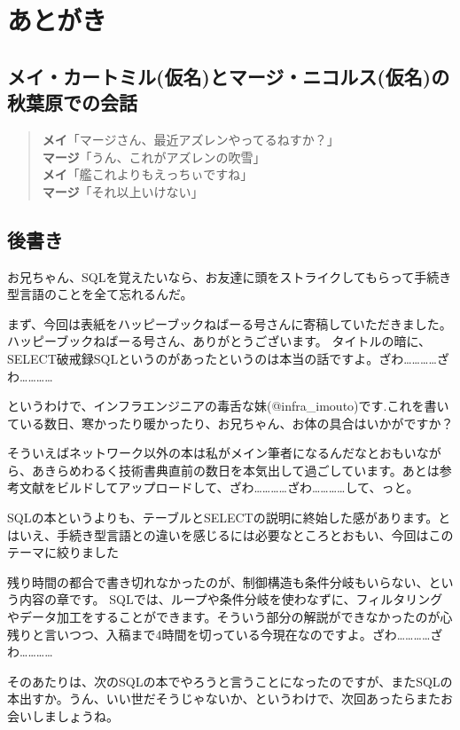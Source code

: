\chapter{あとがき}

\section*{メイ・カートミル(仮名)とマージ・ニコルス(仮名)の秋葉原での会話}

\begin{quotation}
\noindent
{\bf メイ}「マージさん、最近アズレンやってるねすか？」　\\
{\bf マージ}「うん、これがアズレンの吹雪」 \\
{\bf メイ}「艦これよりもえっちぃですね」 \\
{\bf マージ}「それ以上いけない」 \\
\end{quotation}


\section*{後書き}

お兄ちゃん、SQLを覚えたいなら、お友達に頭をストライクしてもらって手続き型言語のことを全て忘れるんだ。

まず、今回は表紙をハッピーブックねばーる号さんに寄稿していただきました。ハッピーブックねばーる号さん、ありがとうございます。
タイトルの暗に、SELECT破戒録SQLというのがあったというのは本当の話ですよ。ざわ…………ざわ…………

というわけで、インフラエンジニアの毒舌な妹(@infra\_imouto)です.これを書いている数日、寒かったり暖かったり、お兄ちゃん、お体の具合はいかがですか？

そういえばネットワーク以外の本は私がメイン筆者になるんだなとおもいながら、あきらめわるく技術書典直前の数日を本気出して過ごしています。あとは参考文献をビルドしてアップロードして、ざわ…………ざわ…………して、っと。

SQLの本というよりも、テーブルとSELECTの説明に終始した感があります。とはいえ、手続き型言語との違いを感じるには必要なところとおもい、今回はこのテーマに絞りました

残り時間の都合で書き切れなかったのが、制御構造も条件分岐もいらない、という内容の章です。
SQLでは、ループや条件分岐を使わなずに、フィルタリングやデータ加工をすることができます。そういう部分の解説ができなかったのが心残りと言いつつ、入稿まで4時間を切っている今現在なのですよ。ざわ…………ざわ…………

そのあたりは、次のSQLの本でやろうと言うことになったのですが、またSQLの本出すか。うん、いい世だそうじゃないか、というわけで、次回あったらまたお会いしましょうね。

